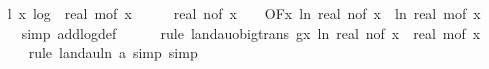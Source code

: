 \begin{isabellebody}
\isanewline
\ \ \isamarkupfalse%
\ l{}{\isacharcolon}{\kern0pt}\ {\isachardoublequoteopen}{\isacharparenleft}{\kern0pt}{\isasymlambda}x{\isachardot}{\kern0pt}\ log\ {}\ {\isacharparenleft}{\kern0pt}real\ {\isacharparenleft}{\kern0pt}m{\isacharunderscore}{\kern0pt}of\ x{\isacharparenright}{\kern0pt}\ {\isacharasterisk}{\kern0pt}\ {\isacharparenleft}{\kern0pt}{}\ {\isacharplus}{\kern0pt}\ {}\ {\isacharasterisk}{\kern0pt}\ real\ {\isacharparenleft}{\kern0pt}n{\isacharunderscore}{\kern0pt}of\ x{\isacharparenright}{\kern0pt}{\isacharparenright}{\kern0pt}\ {\isacharplus}{\kern0pt}\ {}{\isacharparenright}{\kern0pt}{\isacharparenright}{\kern0pt}\ {\isasymin}\ O{\isacharbrackleft}{\kern0pt}{\isacharquery}{\kern0pt}F{\isacharbrackright}{\kern0pt}{\isacharparenleft}{\kern0pt}{\isasymlambda}x{\isachardot}{\kern0pt}\ ln\ {\isacharparenleft}{\kern0pt}real\ {\isacharparenleft}{\kern0pt}n{\isacharunderscore}{\kern0pt}of\ x{\isacharparenright}{\kern0pt}{\isacharparenright}{\kern0pt}\ {\isacharplus}{\kern0pt}\ ln\ {\isacharparenleft}{\kern0pt}real\ {\isacharparenleft}{\kern0pt}m{\isacharunderscore}{\kern0pt}of\ x{\isacharparenright}{\kern0pt}{\isacharparenright}{\kern0pt}{\isacharparenright}{\kern0pt}{\isachardoublequoteclose}\isanewline
\ \ \ \ \isamarkupfalse%
\ {\isacharparenleft}{\kern0pt}simp\ add{\isacharcolon}{\kern0pt}log{\isacharunderscore}{\kern0pt}def{\isacharparenright}{\kern0pt}\isanewline
\ \ \ \ \isamarkupfalse%
\ {\isacharparenleft}{\kern0pt}rule\ landau{\isacharunderscore}{\kern0pt}o{\isachardot}{\kern0pt}big{\isacharunderscore}{\kern0pt}trans{\isacharbrackleft}{\kern0pt}\ g{\isacharequal}{\kern0pt}{\isachardoublequoteopen}{\isasymlambda}x{\isachardot}{\kern0pt}\ ln\ {\isacharparenleft}{\kern0pt}real\ {\isacharparenleft}{\kern0pt}n{\isacharunderscore}{\kern0pt}of\ x{\isacharparenright}{\kern0pt}\ {\isacharasterisk}{\kern0pt}\ real\ {\isacharparenleft}{\kern0pt}m{\isacharunderscore}{\kern0pt}of\ x{\isacharparenright}{\kern0pt}{\isacharparenright}{\kern0pt}{\isachardoublequoteclose}{\isacharbrackright}{\kern0pt}{\isacharparenright}{\kern0pt}\isanewline
\ \ \ \ \ \isamarkupfalse%
\ {\isacharparenleft}{\kern0pt}rule\ landau{\isacharunderscore}{\kern0pt}ln{\isacharunderscore}{\kern0pt}{}{\isacharbrackleft}{\kern0pt}\ a{\isacharequal}{\kern0pt}{\isachardoublequoteopen}{}{\isachardoublequoteclose}{\isacharbrackright}{\kern0pt}{\isacharcomma}{\kern0pt}\ simp{\isacharcomma}{\kern0pt}\ simp{\isacharparenright}{\kern0pt}\isanewline

\end{isabellebody}
